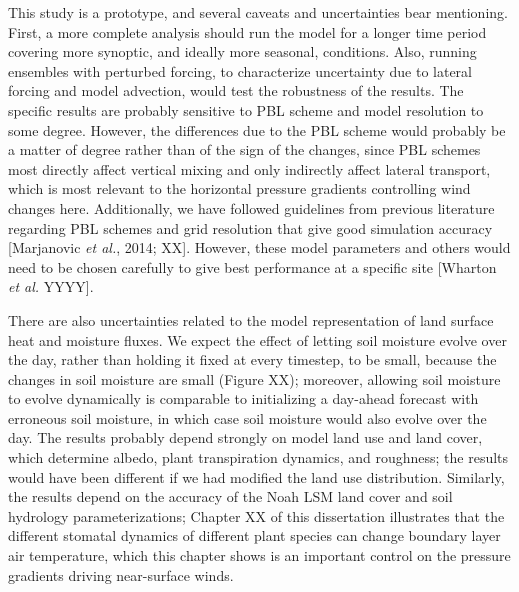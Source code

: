 This study is a prototype, and several caveats and uncertainties bear mentioning.  First, a more complete analysis should run the model for a longer time period covering more synoptic, and ideally more seasonal, conditions.  Also, running ensembles with perturbed forcing, to characterize uncertainty due to lateral forcing and model advection, would test the robustness of the results.  The specific results are probably sensitive to PBL scheme and model resolution to some degree.  However, the differences due to the PBL scheme would probably be a matter of degree rather than of the sign of the changes, since PBL schemes most directly affect vertical mixing and only indirectly affect lateral transport, which is most relevant to the horizontal pressure gradients controlling wind changes here.  Additionally, we have followed guidelines from previous literature regarding PBL schemes and grid resolution that give good simulation accuracy [Marjanovic \textit{et al.}, 2014; XX].  However, these model parameters and others would need to be chosen carefully to give best performance at a specific site [Wharton \textit{et al.} YYYY].

There are also uncertainties related to the model representation of land surface heat and moisture fluxes.  We expect the effect of letting soil moisture evolve over the day, rather than holding it fixed at every timestep, to be small, because the changes in soil moisture are small (Figure XX); moreover, allowing soil moisture to evolve dynamically is comparable to initializing a day-ahead forecast with erroneous soil moisture, in which case soil moisture would also evolve over the day.  The results probably depend strongly on model land use and land cover, which determine albedo, plant transpiration dynamics, and roughness; the results would have been different if we had modified the land use distribution.  Similarly, the results depend on the accuracy of the Noah LSM land cover and soil hydrology parameterizations; Chapter XX of this dissertation illustrates that the different stomatal dynamics of different plant species can change boundary layer air temperature, which this chapter shows is an important control on the pressure gradients driving near-surface winds.

